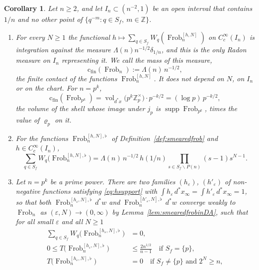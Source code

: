\documentclass[11pt]{amsart}
\newtheorem{corollary}[theorem]{Corollary}
\theoremstyle{definition}
\newcommand{\Z}{\mathbb Z}
\newcommand{\Frob}{\operatorname{Frob}}
\newcommand{\supp}{\operatorname{supp}}
\newcommand{\vol}{\operatorname{vol}}
\newcommand{\cfin}{\mathrm{c}_{\mathrm{fin}}}
\begin{document}
\begin{corollary}\label{cor:frobinvariant}
Let $n\ge2$, and let $I_n\subset(n^{-2},1)$ be an open interval that contains
$1/n$ and no other point of $\{q^{-m}:q\in S_f,\ m\in\Z\}$.
\begin{enumerate}
\item[(i)] For every $N\ge1$ the functional
$h\mapsto\sum_{q\in S_f}W_q(\Frob_n^{[h,N]})$ on $C_c^\infty(I_n)$ is
integration against the measure $\Lambda(n)n^{-1/2}\delta_{1/n}$, and this is
the only Radon measure on $I_n$ representing it. We call the mass of this
measure,
\begin{equation}\label{eq:frobcontactdef}
  \cfin(\Frob_n):=\Lambda(n)\,n^{-1/2},
\end{equation}
the \emph{finite contact} of the functions $\Frob_n^{[h,N]}$. It does not
depend on $N$, on $I_n$ or on the chart. For $n=p^k$,
\begin{equation}\label{eq:frobvolume}
  \cfin(\Frob_{p^k})=\vol_{d^*x}\bigl(p^k\Z_p^\times\bigr)\cdot p^{-k/2}
   =(\log p)\,p^{-k/2},
\end{equation}
the volume of the shell whose image under $j_p$ is $\supp\Frob_{p^k}$, times
the value of $\varrho_p$ on it.
\item[(ii)] For the functions $\Frob_n^{[h,N],\flat}$ of
Definition~\ref{def:smearedfrob} and $h\in C_c^\infty(I_n)$,
\begin{equation}\label{eq:flatcontact}
  \sum_{q\in S_f}W_q\bigl(\Frob_n^{[h,N],\flat}\bigr)
   =\Lambda(n)\,n^{-1/2}\,h(1/n)\prod_{s\in S_f\smallsetminus P(n)}(s-1)s^{N-1}.
\end{equation}
\item[(iii)] Let $n=p^k$ be a prime power. There are two families
$(h_\varepsilon)$, $(h'_\varepsilon)$ of non-negative functions satisfying
\eqref{eq:hsupport} with $\int h_\varepsilon\,d^*x_\infty
=\int h'_\varepsilon\,d^*x_\infty=1$, so that both
$\Frob_n^{[h_\varepsilon,N],\flat}\,d^*w$ and
$\Frob_n^{[h'_\varepsilon,N],\flat}\,d^*w$ converge weakly to $\Frob_n$ as
$(\varepsilon,N)\to(0,\infty)$ by Lemma~\ref{lem:smearedfrobinDA}, such that
for all small $\varepsilon$ and all $N\ge1$
\begin{align*}
  \sum_{q\in S_f}W_q\bigl(\Frob_n^{[h_\varepsilon,N],\flat}\bigr)&=0,\\
  0\le T\bigl(\Frob_n^{[h_\varepsilon,N],\flat}\bigr)&\le\frac{2n^{1/2}}{n-1}
  \quad\text{if }S_f=\{p\},\\
  T\bigl(\Frob_n^{[h_\varepsilon,N],\flat}\bigr)&=0
  \quad\text{if }S_f\ne\{p\}\text{ and }2^N\ge n,\\

\end{align*}
\end{enumerate}
\end{corollary}
\end{document}

